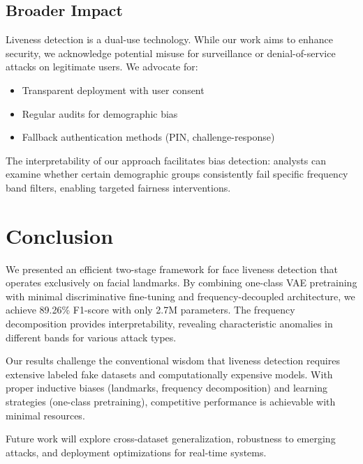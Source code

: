 \documentclass{article}
\begin{document}
\subsection{Broader Impact}

Liveness detection is a dual-use technology. While our work aims to enhance security, we acknowledge potential misuse for surveillance or denial-of-service attacks on legitimate users. We advocate for:
\begin{itemize}
    \item Transparent deployment with user consent
    \item Regular audits for demographic bias
    \item Fallback authentication methods (PIN, challenge-response)
\end{itemize}

The interpretability of our approach facilitates bias detection: analysts can examine whether certain demographic groups consistently fail specific frequency band filters, enabling targeted fairness interventions.

\section{Conclusion}

We presented an efficient two-stage framework for face liveness detection that operates exclusively on facial landmarks. By combining one-class VAE pretraining with minimal discriminative fine-tuning and frequency-decoupled architecture, we achieve 89.26\% F1-score with only 2.7M parameters. The frequency decomposition provides interpretability, revealing characteristic anomalies in different bands for various attack types.

Our results challenge the conventional wisdom that liveness detection requires extensive labeled fake datasets and computationally expensive models. With proper inductive biases (landmarks, frequency decomposition) and learning strategies (one-class pretraining), competitive performance is achievable with minimal resources.

Future work will explore cross-dataset generalization, robustness to emerging attacks, and deployment optimizations for real-time systems.



\end{document}
